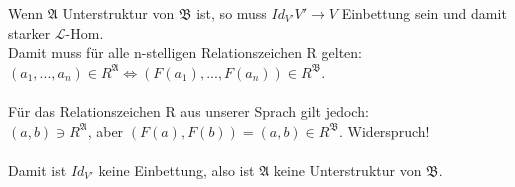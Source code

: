 \documentclass[a4paper]{scrartcl}
\begin{document}
\begin{itemize}
            Wenn $\mathfrak{A}$ Unterstruktur von $\mathfrak{B}$ ist, so muss $Id_{V'} V' \rightarrow V$ Einbettung sein und damit starker $\mathscr{L}$-Hom.\\
            Damit muss für alle n-stelligen Relationszeichen R gelten:\\
            $(a_1,...,a_n) \in R^\mathfrak{A} \Leftrightarrow (F(a_1),...,F(a_n)) \in R^\mathfrak{B}$.\\

            \\Für das Relationszeichen R aus unserer Sprach gilt jedoch:\\
            $(a,b) \ni R^\mathfrak{A}$, aber $(F(a), F(b)) = (a, b) \in R^\mathfrak{B}$. Widerspruch!\\
            
            \\Damit ist $Id_{V'}$ keine Einbettung, also ist $\mathfrak{A}$ keine Unterstruktur von $\mathfrak{B}$.
        
    \end{itemize}
\end{document}
